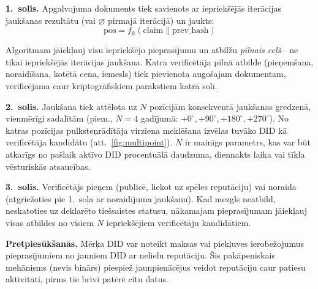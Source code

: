 \documentclass[11pt,a4paper,twocolumn]{article}
\begin{document}
\textbf{1.\ solis.} Apgalvojuma dokuments tiek savienots ar iepriekšējās iterācijas jaukšanas rezultātu (vai $\varnothing$ pirmajā iterācijā) un jaukts:
\begin{equation}
\text{pos} = f_h(\text{claim} \| \text{prev\_hash})
\label{eq:hash}
\end{equation}

Algoritmam jāiekļauj visu iepriekšējo pieprasījumu un atbilžu \emph{pilnais ceļš}---ne tikai iepriekšējās iterācijas jaukšana. Katra verificētāja pilnā atbilde (pieņemšana, noraidīšana, kotētā cena, iemesls) tiek pievienota augošajam dokumentam, verificējama caur kriptogrāfiskiem parakstiem katrā solī.

\textbf{2.\ solis.} Jaukšana tiek attēlota uz $N$ pozīcijām konsekventā jaukšanas gredzenā, vienmērīgi sadalītām (piem., $N=4$ gadījumā: $+0^{\circ}, +90^{\circ}, +180^{\circ}, +270^{\circ}$). No katras pozīcijas pulksteņrādītāja virziena meklēšana izvēlas tuvāko DID kā verificētāja kandidātu (att.~\ref{fig:multipoint}). $N$ ir mainīgs parametrs, kas var būt atkarīgs no pašlaik aktīvo DID procentuālā daudzuma, diennakts laika vai tīkla vēsturiskās atsaucības.

\textbf{3.\ solis.} Verificētājs pieņem (publicē, liekot uz spēles reputāciju) vai noraida (atgriežoties pie 1.\ soļa ar noraidījuma jaukšanu). Kad mezgls neatbild, neskatoties uz deklarēto tiešsaistes statusu, nākamajam pieprasījumam jāiekļauj visas atbildes no visiem $N$ iepriekšējiem verificētāju kandidātiem.

\textbf{Pretpiesūkšanās.} Mērķa DID var noteikt maksas vai piekļuves ierobežojumus pieprasījumiem no jauniem DID ar nelielu reputāciju. Šis pakāpeniskais mehānisms (nevis binārs) piespiež jaunpienācējus veidot reputāciju caur patiesu aktivitāti, pirms tie brīvi patērē citu datus.
\end{document}

